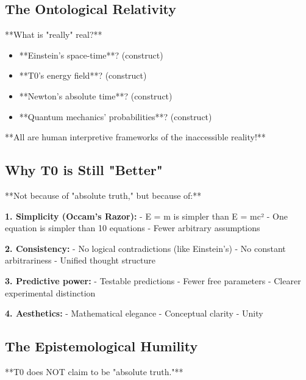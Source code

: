 \documentclass[12pt,a4paper]{article}
\begin{document}
{{{{{{{{{{											\subsection{The Ontological Relativity}
											
											**What is "really" real?**
											\begin{itemize}
												\item **Einstein's space-time**? (construct)
												\item **T0's energy field**? (construct)
												\item **Newton's absolute time**? (construct)
												\item **Quantum mechanics' probabilities**? (construct)
											\end{itemize}
											
											**All are human interpretive frameworks of the inaccessible reality!**
											
											\subsection{Why T0 is Still "Better"}
											
											**Not because of "absolute truth," but because of:**
											
											\textbf{1. Simplicity (Occam's Razor):}
											- E = m is simpler than E = mc²
											- One equation is simpler than 10 equations
											- Fewer arbitrary assumptions
											
											\textbf{2. Consistency:}
											- No logical contradictions (like Einstein's)
											- No constant arbitrariness
											- Unified thought structure
											
											\textbf{3. Predictive power:}
											- Testable predictions
											- Fewer free parameters
											- Clearer experimental distinction
											
											\textbf{4. Aesthetics:}
											- Mathematical elegance
											- Conceptual clarity
											- Unity
											
											\subsection{The Epistemological Humility}
											
											**T0 does NOT claim to be "absolute truth."**
											
}}}}}}}}}}
\end{document}
